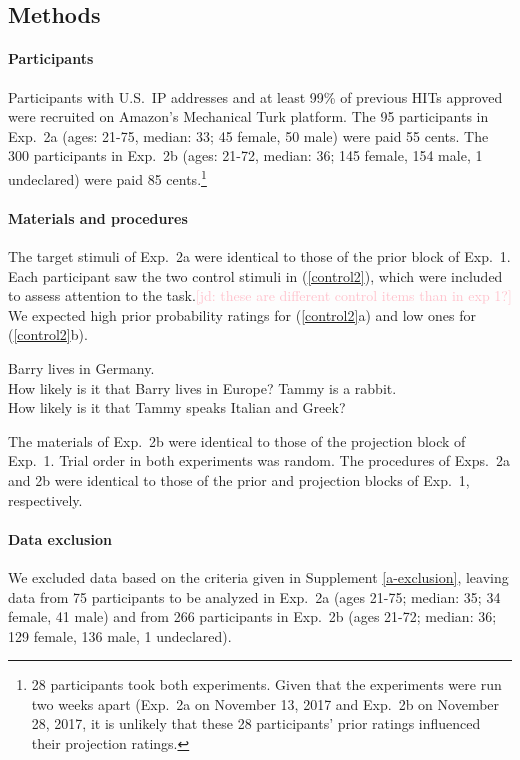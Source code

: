 \documentclass[11pt,fleqn]{article}
\newcommand{\jd}[1]{\textcolor{Pink}{[jd: #1]}}
\newcommand{\6}{\mbox{$[\hspace*{-.6mm}[$}}
\newcommand{\9}{\mbox{$]\hspace*{-.6mm}]$}}
\begin{document}
\subsection{Methods}


\paragraph{Participants} Participants with U.S.\ IP addresses and at least 99\% of previous HITs approved were recruited on Amazon's Mechanical Turk platform. The 95 participants in Exp.~2a (ages: 21-75, median: 33; 45 female, 50 male) were paid 55 cents. The 300 participants in Exp.~2b (ages: 21-72, median: 36; 145 female, 154 male, 1 undeclared) were paid 85 cents.\footnote{28 participants took both experiments. Given that the experiments were run two weeks apart (Exp.~2a on November 13, 2017 and Exp.~2b on November 28, 2017, it is unlikely that these 28 participants' prior ratings influenced their projection ratings.}

\paragraph{Materials and procedures} The target stimuli of Exp.~2a were identical to those of the prior block of Exp.~1. Each participant saw the two control stimuli in (\ref{control2}), which were included to assess attention to the task.\jd{these are different control items than in exp 1?} We expected high prior probability ratings for (\ref{control2}a) and low ones for (\ref{control2}b). 

\begin{exe}
\ex\label{control2}
\begin{xlist}
 Barry lives in Germany. \\ How likely is it that Barry lives in Europe?
 Tammy is a rabbit. \\ How likely is it that Tammy speaks Italian and Greek?
\end{xlist}
\end{exe}
The materials of Exp.~2b were identical to those of the projection block of Exp.~1. Trial order in both experiments was random. The procedures of Exps.~2a and 2b were identical to those of the prior and projection blocks of Exp.~1, respectively.

\paragraph{Data exclusion} We excluded data based on the criteria given in Supplement \ref{a-exclusion}, leaving data from 75 participants to be analyzed in Exp.~2a (ages 21-75; median: 35; 34 female, 41 male) and from 266 participants in Exp.~2b (ages 21-72; median: 36; 129 female, 136 male, 1 undeclared).
\end{document}
